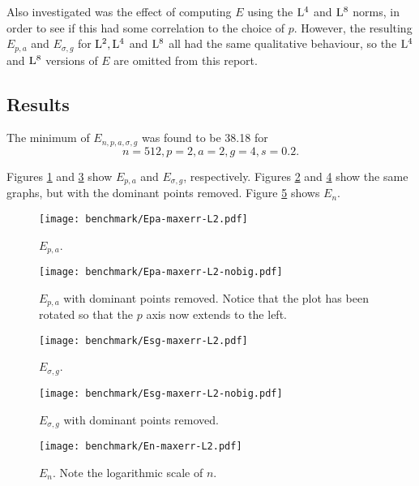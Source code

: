Also investigated was the effect of computing $E$ using the $\Lp[4]$
and $\Lp[8]$ norms, in order to see if this had some correlation to
the choice of $p$. However, the resulting $E_{p,a}$ and $E_{\sigma,g}$ for
$\Lp[2], \Lp[4]$ and $\Lp[8]$ all had the same qualitative behaviour,
so the $\Lp[4]$ and $\Lp[8]$ versions of $E$ are omitted from this
report.

\subsection{Results}

The minimum of $E_{n,p,a,\sigma,g}$ was found to be 38.18 for
\begin{equation*}
  n=512, p=2, a=2, g=4, s=0.2.
\end{equation*}

Figures \ref{fig:Epa-maxerr-L2} and \ref{fig:Esg-maxerr-L2} show
$E_{p,a}$ and $E_{\sigma,g}$, respectively. Figures
\ref{fig:Epa-maxerr-L2-nobig} and \ref{fig:Esg-maxerr-L2-nobig} show
the same graphs, but with the dominant points removed. Figure
\ref{fig:En-maxerr-L2} shows $E_n$.

\begin{figure}[p]
  \centering
  \texttt{[image: benchmark/Epa-maxerr-L2.pdf]}
  \caption{$E_{p,a}$.}
  \label{fig:Epa-maxerr-L2}
\end{figure}

\begin{figure}[p]
  \centering
  \texttt{[image: benchmark/Epa-maxerr-L2-nobig.pdf]}
  \caption{$E_{p,a}$ with dominant points removed. Notice that the
    plot has been rotated so that the $p$ axis now extends to the
    left.}
  \label{fig:Epa-maxerr-L2-nobig}
\end{figure}

\begin{figure}[p]
  \centering
  \texttt{[image: benchmark/Esg-maxerr-L2.pdf]}
  \caption{$E_{\sigma,g}$.}
  \label{fig:Esg-maxerr-L2}
\end{figure}

\begin{figure}[p]
  \centering
  \texttt{[image: benchmark/Esg-maxerr-L2-nobig.pdf]}
  \caption{$E_{\sigma,g}$ with dominant points removed.}
  \label{fig:Esg-maxerr-L2-nobig}
\end{figure}

\begin{figure}[p]
  \centering
  \texttt{[image: benchmark/En-maxerr-L2.pdf]}
  \caption{$E_n$. Note the logarithmic scale of $n$.}
  \label{fig:En-maxerr-L2}
\end{figure}


